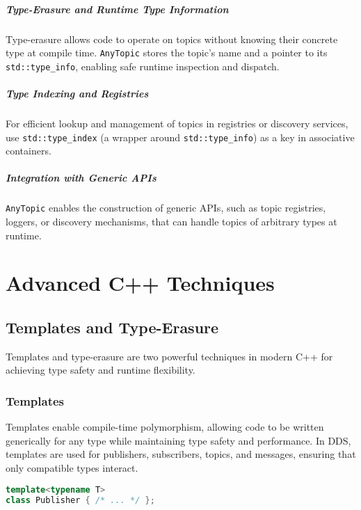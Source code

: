 \documentclass[12pt]{report}
\begin{document}
\paragraph{Type-Erasure and Runtime Type Information}
Type-erasure allows code to operate on topics without knowing their concrete type at compile time. \texttt{AnyTopic} stores the topic's name and a pointer to its \texttt{std::type\_info}, enabling safe runtime inspection and dispatch.

\paragraph{Type Indexing and Registries}
For efficient lookup and management of topics in registries or discovery services, use \texttt{std::type\_index} (a wrapper around \texttt{std::type\_info}) as a key in associative containers.

\paragraph{Integration with Generic APIs}
\texttt{AnyTopic} enables the construction of generic APIs, such as topic registries, loggers, or discovery mechanisms, that can handle topics of arbitrary types at runtime.

\chapter{Advanced C++ Techniques}

\section{Templates and Type-Erasure}
Templates and type-erasure are two powerful techniques in modern C++ for achieving type safety and runtime flexibility.

\subsection{Templates}
Templates enable compile-time polymorphism, allowing code to be written generically for any type while maintaining type safety and performance. In DDS, templates are used for publishers, subscribers, topics, and messages, ensuring that only compatible types interact.

\begin{lstlisting}[language=C++]
template<typename T>
class Publisher { /* ... */ };
\end{lstlisting}
\end{document}
